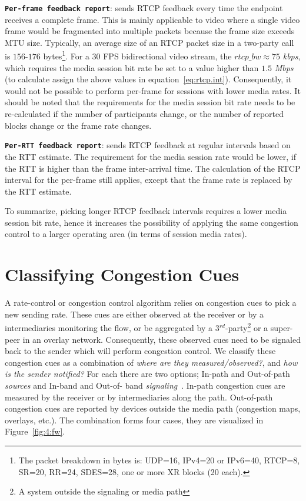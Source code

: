 \textbf{\texttt{Per-frame feedback report}}: sends RTCP feedback every time
the endpoint receives a complete frame. This is mainly applicable to video
where a single video frame would be fragmented into multiple packets because
the frame size exceeds MTU size. Typically, an average size of an RTCP packet
size in a two-party call is $156$-$176$ bytes\footnote{The packet breakdown in
bytes is: UDP=16, IPv4=20 or IPv6=40, RTCP=8, SR=20, RR=24, SDES=28, one or
more XR blocks (20 each).}. For a 30 FPS bidirectional video stream, the
$rtcp\_bw \approx 75$ \emph{kbps}, which requires the media session bit rate
be set to a value higher than $1.5$ \emph{Mbps} (to calculate assign the above
values in equation~\ref{eq:rtcp.int}). Consequently, it would not be possible
to perform per-frame for sessions with lower media rates. It should be noted
that the requirements for the media session bit rate needs to be re-calculated
if the number of participants change, or the number of reported blocks change
or the frame rate changes.

\textbf{\texttt{Per-RTT feedback report}}: sends RTCP feedback at regular
intervals based on the RTT estimate. The requirement for the media session
rate would be lower, if the RTT is higher than the frame inter-arrival time.
The calculation of the RTCP interval for the per-frame still applies, except
that the frame rate is replaced by the RTT estimate.

To summarize, picking longer RTCP feedback intervals requires a lower media
session bit rate, hence it increases the possibility of applying the same
congestion control to a larger operating area (in terms of session media
rates).

\section{Classifying Congestion Cues}
\label{fw.fw}

A rate-control or congestion control algorithm relies on congestion cues to
pick a new sending rate. These cues are either observed at the receiver or by
a intermediaries monitoring the flow, or be aggregated by a
3$^{rd}$-party\footnote{A system outside the signaling or media path} or a
super-peer in an overlay network. Consequently, these observed cues need to be
signaled back to the sender which will perform congestion control. We classify
these congestion cues as a combination of \emph{where are they
measured/observed?}, and \emph{how is the sender notified?} For each there are
two options; In-path and Out-of-path \emph{sources} and In-band and Out-of-%
band \emph{signaling}~\cite{Singh:PhDFw}. In-path congestion cues are measured
by the receiver or by intermediaries along the path. Out-of-path congestion
cues are reported by devices outside the media path (congestion maps,
overlays, etc.). The combination forms four cases, they are visualized in
Figure~\ref{fig:4:fw}.

